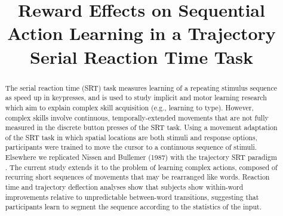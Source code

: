 \documentclass[conference]{IEEEtran}
\begin{document}
\title{Reward Effects on Sequential Action Learning in a Trajectory Serial Reaction Time Task}
 
\author{
}




\maketitle


\begin{abstract}

The serial reaction time (SRT) task measures learning of a repeating stimulus sequence as speed up in keypresses, and is used to study implicit and motor learning research which aim to explain complex skill acquisition (e.g., learning to type). However, complex skills involve continuous, temporally-extended movements that are not fully measured in the discrete button presses of the SRT task. Using a movement adaptation of the SRT task in which spatial locations are both stimuli and response options, participants were trained to move the cursor to a continuous sequence of stimuli. Elsewhere we replicated Nissen and Bullemer (1987) \cite{Nissen:1987} with the trajectory SRT paradigm \cite{Kachergis:2014}. The current study extends it to the problem of learning complex actions, composed of recurring short sequences of movements that may be rearranged like words. Reaction time and trajectory deflection analyses show that subjects show within-word improvements relative to unpredictable between-word transitions, suggesting that participants learn to segment the sequence according to the statistics of the input.

\end{abstract}
\end{document}
